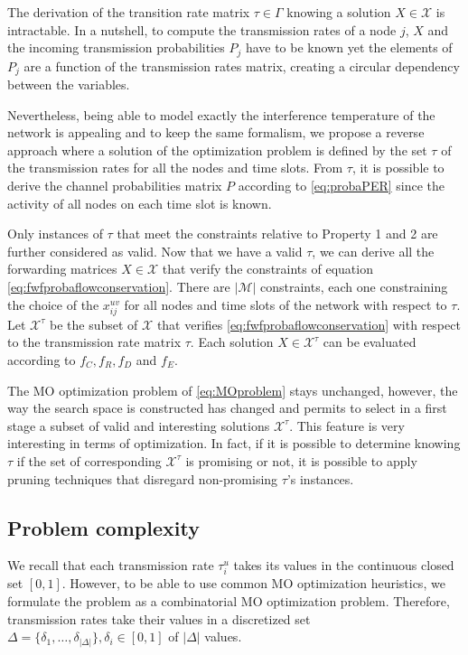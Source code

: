 \documentclass[a4paper]{article}
\newcommand{\M}{\mathcal{M}}
\newcommand{\X}{\mathcal{X}}
\begin{document}
The derivation of the transition rate matrix $\tau \in \Gamma$ knowing a solution $X \in \X$ is intractable. In a nutshell, to compute the transmission rates of a node $j$, $X$ and the incoming transmission probabilities $P_j$  have to be known yet the elements of $P_{j}$ are a function of the transmission rates matrix, creating a circular dependency between the variables.

Nevertheless, being able to model exactly the interference temperature of the network is appealing and to keep the same formalism, we propose a reverse approach where a solution of the optimization problem is defined by the set $\tau$ of the transmission rates for all the nodes and time slots. From $\tau$, it is possible to derive the channel probabilities matrix $P$ according to \eqref{eq:probaPER} since the activity of all nodes on each time slot is known. 

Only instances of $\tau$ that meet the constraints relative to Property 1 and 2 are further considered as valid. 
Now that we have a valid $\tau$, we can derive all the forwarding matrices $X \in \X$ that verify the constraints of equation \eqref{eq:fwfprobaflowconservation}. 
There are $|\M|$ constraints, each one constraining the choice of the $x_{ij}^{uv}$ for all nodes and time slots of the network with respect to $\tau$.
Let $\X^{\tau}$ be the subset of $\X$ that verifies \eqref{eq:fwfprobaflowconservation} with respect to the transmission rate matrix $\tau$. 
Each solution $X \in \X^{\tau}$ can be evaluated according to $f_C, f_R, f_D$ and $f_E$. 

The MO optimization problem of \eqref{eq:MOproblem} stays unchanged, however, the way the search space is constructed has changed and permits to select in a first stage a subset of valid and interesting solutions $\X^{\tau}$. 
This feature is very interesting in terms of optimization. In fact, if it is possible to determine knowing $\tau$ if the set of corresponding $\X^{\tau}$ is promising or not, it is possible to apply pruning techniques that disregard non-promising $\tau$'s instances. 

\subsection{Problem complexity}
We recall that each transmission rate $\tau_i^u$ takes its values in the continuous closed set $\left[0,1\right]$. However, to be able to use common MO optimization heuristics, we formulate the problem as a combinatorial MO optimization problem. Therefore,  transmission rates take their values in a discretized set $\Delta = \{\delta_1, \dots, \delta_{|\Delta|}\}, \delta_i \in \left[0,1\right]$ of $|\Delta|$ values.
\end{document}
